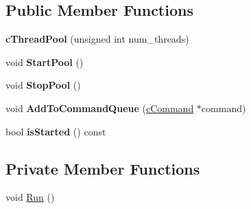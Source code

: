 \subsection*{\-Public \-Member \-Functions}
\begin{DoxyCompactItemize}
\item 
\hypertarget{classengine_1_1cThreadPool_a1cef23416a63c1a652d07b074a40b42e}{{\bfseries c\-Thread\-Pool} (unsigned int num\-\_\-threads)}\label{classengine_1_1cThreadPool_a1cef23416a63c1a652d07b074a40b42e}

\item 
\hypertarget{classengine_1_1cThreadPool_a97cf0269aebd226e59d973a89181d709}{void {\bfseries \-Start\-Pool} ()}\label{classengine_1_1cThreadPool_a97cf0269aebd226e59d973a89181d709}

\item 
\hypertarget{classengine_1_1cThreadPool_aeafab9fa5546e10b0deebff1e8df60d9}{void {\bfseries \-Stop\-Pool} ()}\label{classengine_1_1cThreadPool_aeafab9fa5546e10b0deebff1e8df60d9}

\item 
\hypertarget{classengine_1_1cThreadPool_a0c20020f1a69f4ea0abdb75d1adde225}{void {\bfseries \-Add\-To\-Command\-Queue} (\hyperlink{classengine_1_1cCommand}{c\-Command} $\ast$command)}\label{classengine_1_1cThreadPool_a0c20020f1a69f4ea0abdb75d1adde225}

\item 
\hypertarget{classengine_1_1cThreadPool_a207b8bcf506d3cd151f0fc815772111c}{bool {\bfseries is\-Started} () const }\label{classengine_1_1cThreadPool_a207b8bcf506d3cd151f0fc815772111c}

\end{DoxyCompactItemize}
\subsection*{\-Private \-Member \-Functions}
\begin{DoxyCompactItemize}
\item 
void \hyperlink{classengine_1_1cThreadPool_af573f11026d6b6079c56af7e50df5ca6}{\-Run} ()
\end{DoxyCompactItemize}
